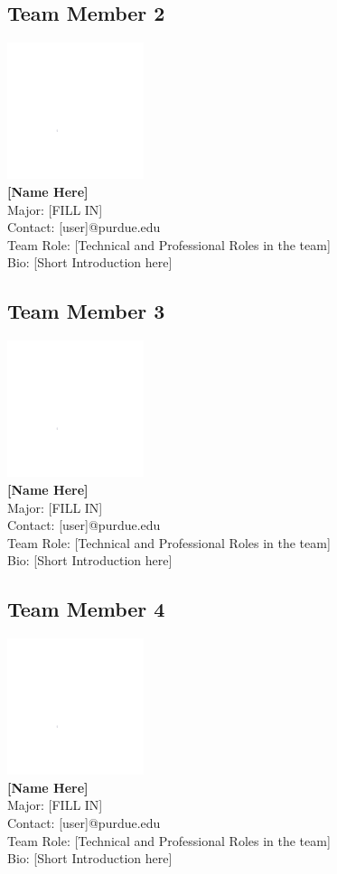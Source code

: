 \documentclass[letterpaper, 11pt]{article}
\begin{document}
\subsection{Team Member 2}
\includegraphics[height=4cm]{images/white.png} \\
\textbf{[Name Here]}\\
Major: [FILL IN]\\
Contact: [user]@purdue.edu\\
Team Role: [Technical and Professional Roles in the team] \\
Bio: [Short Introduction here]

\subsection{Team Member 3}
\includegraphics[height=4cm]{images/white.png} \\
\textbf{[Name Here]}\\
Major: [FILL IN]\\
Contact: [user]@purdue.edu\\
Team Role: [Technical and Professional Roles in the team] \\
Bio: [Short Introduction here]

\subsection{Team Member 4}
\includegraphics[height=4cm]{images/white.png} \\
\textbf{[Name Here]}\\
Major: [FILL IN]\\
Contact: [user]@purdue.edu\\
Team Role: [Technical and Professional Roles in the team] \\
Bio: [Short Introduction here]
\end{document}
